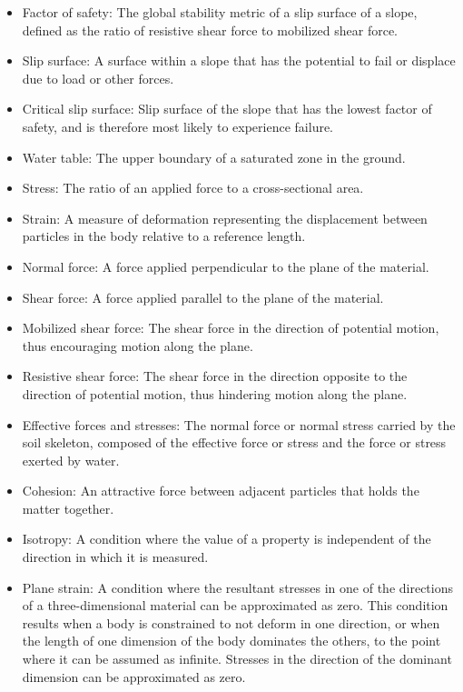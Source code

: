 \documentclass[12pt]{article}
\begin{document}
\begin{itemize}
\item{Factor of safety: The global stability metric of a slip surface of a slope, defined as the ratio of resistive shear force to mobilized shear force.}
\item{Slip surface: A surface within a slope that has the potential to fail or displace due to load or other forces.}
\item{Critical slip surface: Slip surface of the slope that has the lowest factor of safety, and is therefore most likely to experience failure.}
\item{Water table: The upper boundary of a saturated zone in the ground.}
\item{Stress: The ratio of an applied force to a cross-sectional area.}
\item{Strain: A measure of deformation representing the displacement between particles in the body relative to a reference length.}
\item{Normal force: A force applied perpendicular to the plane of the material.}
\item{Shear force: A force applied parallel to the plane of the material.}
\item{Mobilized shear force: The shear force in the direction of potential motion, thus encouraging motion along the plane.}
\item{Resistive shear force: The shear force in the direction opposite to the direction of potential motion, thus hindering motion along the plane.}
\item{Effective forces and stresses: The normal force or normal stress carried by the soil skeleton, composed of the effective force or stress and the force or stress exerted by water.}
\item{Cohesion: An attractive force between adjacent particles that holds the matter together.}
\item{Isotropy: A condition where the value of a property is independent of the direction in which it is measured.}
\item{Plane strain: A condition where the resultant stresses in one of the directions of a  three-dimensional material can be approximated as zero. This condition results when a body is constrained to not deform in one direction, or when the length of one dimension of the body dominates the others, to the point where it can be assumed as infinite. Stresses in the direction of the dominant dimension can be approximated as zero.}
\end{itemize}
\end{document}
